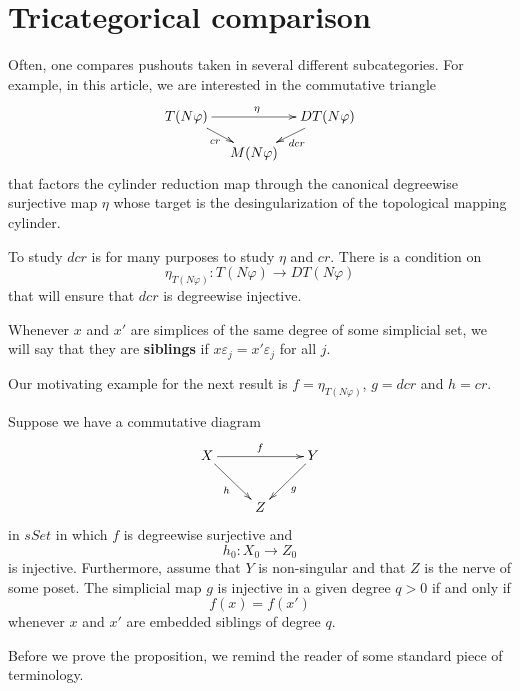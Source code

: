 
\section{Tricategorical comparison}
\label{sec:tricat}

Often, one compares pushouts taken in several different subcategories. For example, in this article, we are interested in the commutative triangle
\begin{equation}
\label{eq:first_diagram_proof_prop_barratt_nerve_rep_map_dcr_inj}
\begin{gathered}
\xymatrix@=1em{
T(N\varphi ) \ar[dr]_{cr} \ar[rr]^{\eta } && DT(N\varphi ) \ar[ld]^{dcr} \\
& M(N\varphi )
}
\end{gathered}
\end{equation}
that factors the cylinder reduction map through the canonical degreewise surjective map $\eta$ whose target is the desingularization of the topological mapping cylinder.

To study $dcr$ is for many purposes to study $\eta$ and $cr$. There is a condition on
\[\eta _{T(N\varphi )}:T(N\varphi )\to DT(N\varphi )\]
that will ensure that $dcr$ is degreewise injective.
\begin{definition}
\label{def:siblings}
Whenever $x$ and $x'$ are simplices of the same degree of some simplicial set, we will say that they are \textbf{siblings} if $x\varepsilon _j=x'\varepsilon _j$ for all $j$.
\end{definition}
\noindent Our motivating example for the next result is $f=\eta _{T(N\varphi )}$, $g=dcr$ and $h=cr$.
\begin{proposition}\label{prop:criterion_degreewise_injective_into_nerve_computation}
Suppose we have a commutative diagram
\begin{displaymath}
\xymatrix{
X \ar[dr]_h \ar[rr]^f && Y \ar[ld]^g \\
& Z
}
\end{displaymath}
in $sSet$ in which $f$ is degreewise surjective and
\[h_0:X_0\to Z_0\]
is injective. Furthermore, assume that $Y$ is non-singular and that $Z$ is the nerve
of some poset. The simplicial map $g$ is injective in a given degree $q>0$ if and only if
\[f(x)=f(x')\]
whenever $x$ and $x'$ are embedded siblings of degree $q$.
\end{proposition}
\noindent Before we prove the proposition, we remind the reader of some standard piece of terminology.

